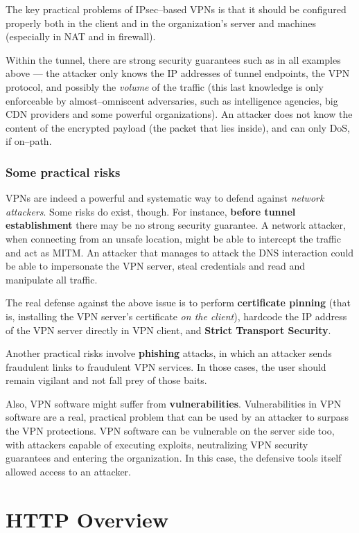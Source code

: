 \documentclass[10pt]{extreport}
\begin{document}
The key practical problems of IPsec--based VPNs is that it should be configured
properly both in the client and in the organization's server and machines
(especially in NAT and in firewall).

Within the tunnel, there are strong security guarantees such as in all examples
above --- the attacker only knows the IP addresses of tunnel endpoints, the VPN
protocol, and possibly the \emph{volume} of the traffic (this last knowledge is
only enforceable by almost--omniscent adversaries, such as intelligence
agencies, big CDN providers and some powerful organizations). An attacker does
not know the content of the encrypted payload (the packet that lies inside),
and can only DoS, if on--path.

\subsection{Some practical risks}

VPNs are indeed a powerful and systematic way to defend against \emph{network
attackers}. Some risks do exist, though. For instance, \textbf{before tunnel
establishment} there may be no strong security guarantee. A network attacker,
when connecting from an unsafe location, might be able to intercept the traffic
and act as MITM. An attacker that manages to attack the DNS interaction could
be able to impersonate the VPN server, steal credentials and read and
manipulate all traffic.

The real defense against the above issue is to perform \textbf{certificate
pinning} (that is, installing the VPN server's certificate \emph{on the
client}), hardcode the IP address of the VPN server directly in VPN client, and
\textbf{Strict Transport Security}.

Another practical risks involve \textbf{phishing} attacks, in which an attacker
sends fraudulent links to fraudulent VPN services. In those cases, the user
should remain vigilant and not fall prey of those baits.

Also, VPN software might suffer from \textbf{vulnerabilities}. Vulnerabilities
in VPN software are a real, practical problem that can be used by an attacker
to surpass the VPN protections. VPN software can be vulnerable on the server
side too, with attackers capable of executing exploits, neutralizing VPN
security guarantees and entering the organization. In this case, the defensive
tools itself allowed access to an attacker.

\chapter{HTTP Overview}
\end{document}
